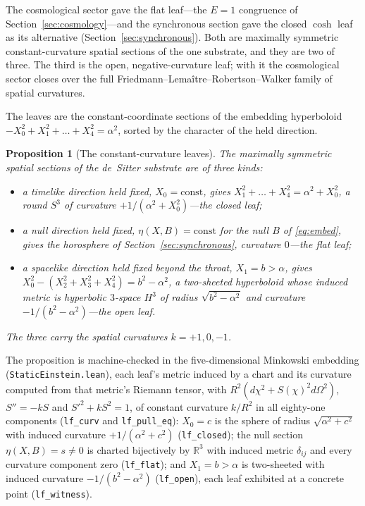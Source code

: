 \documentclass[11pt,a4paper]{article}
\newtheorem{proposition}[theorem]{Proposition}
\theoremstyle{definition}
\begin{document}
The cosmological sector gave the flat leaf---the $E=1$ congruence of Section~\ref{sec:cosmology}---and the synchronous section gave the closed $\cosh$ leaf as its alternative (Section~\ref{sec:synchronous}). Both are maximally symmetric constant-curvature spatial sections of the one substrate, and they are two of three. The third is the open, negative-curvature leaf; with it the cosmological sector closes over the full Friedmann--Lema\^itre--Robertson--Walker family of spatial curvatures.

The leaves are the constant-coordinate sections of the embedding hyperboloid $-X_{0}^{2}+X_{1}^{2}+\dots+X_{4}^{2}=\alpha^{2}$, sorted by the character of the held direction.

\begin{proposition}[The constant-curvature leaves]\label{prop:trichotomy}
The maximally symmetric spatial sections of the de~Sitter substrate are of three kinds:
\begin{itemize}
\item a timelike direction held fixed, $X_{0}=\mathrm{const}$, gives $X_{1}^{2}+\dots+X_{4}^{2}=\alpha^{2}+X_{0}^{2}$, a round $S^{3}$ of curvature $+1/(\alpha^{2}+X_{0}^{2})$---the \emph{closed} leaf;
\item a null direction held fixed, $\eta(X,B)=\mathrm{const}$ for the null $B$ of \eqref{eq:embed}, gives the horosphere of Section~\ref{sec:synchronous}, curvature $0$---the \emph{flat} leaf;
\item a spacelike direction held fixed beyond the throat, $X_{1}=b>\alpha$, gives $X_{0}^{2}-(X_{2}^{2}+X_{3}^{2}+X_{4}^{2})=b^{2}-\alpha^{2}$, a two-sheeted hyperboloid whose induced metric is hyperbolic $3$-space $H^{3}$ of radius $\sqrt{b^{2}-\alpha^{2}}$ and curvature $-1/(b^{2}-\alpha^{2})$---the \emph{open} leaf.
\end{itemize}
The three carry the spatial curvatures $k=+1,0,-1$.
\end{proposition}

The proposition is machine-checked in the five-dimensional Minkowski embedding (\texttt{StaticEinstein.lean}), each leaf's metric induced by a chart and its curvature computed from that metric's Riemann tensor, with $R^{2}(d\chi^{2}+S(\chi)^{2}d\Omega^{2})$, $S''=-kS$ and $S'^{2}+kS^{2}=1$, of constant curvature $k/R^{2}$ in all eighty-one components (\texttt{lf\_curv} and \texttt{lf\_pull\_eq}): $X_{0}=c$ is the sphere of radius $\sqrt{\alpha^{2}+c^{2}}$ with induced curvature $+1/(\alpha^{2}+c^{2})$ (\texttt{lf\_closed}); the null section $\eta(X,B)=s\neq0$ is charted bijectively by $\mathbb{R}^{3}$ with induced metric $\delta_{ij}$ and every curvature component zero (\texttt{lf\_flat}); and $X_{1}=b>\alpha$ is two-sheeted with induced curvature $-1/(b^{2}-\alpha^{2})$ (\texttt{lf\_open}), each leaf exhibited at a concrete point (\texttt{lf\_witness}).
\end{document}
